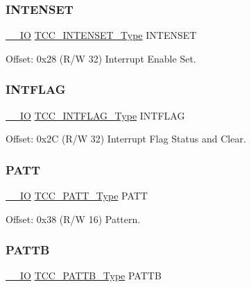 \subsubsection{\texorpdfstring{INTENSET}{INTENSET}}
{\footnotesize\ttfamily \mbox{\hyperlink{core__cm0plus_8h_aec43007d9998a0a0e01faede4133d6be}{\+\_\+\+\_\+\+IO}} \mbox{\hyperlink{union_t_c_c___i_n_t_e_n_s_e_t___type}{T\+C\+C\+\_\+\+I\+N\+T\+E\+N\+S\+E\+T\+\_\+\+Type}} I\+N\+T\+E\+N\+S\+ET}



Offset\+: 0x28 (R/W 32) Interrupt Enable Set. 

\mbox{\label{struct_tcc_ac336c2677229711cac183a8a51b2a6c9}} 
\subsubsection{\texorpdfstring{INTFLAG}{INTFLAG}}
{\footnotesize\ttfamily \mbox{\hyperlink{core__cm0plus_8h_aec43007d9998a0a0e01faede4133d6be}{\+\_\+\+\_\+\+IO}} \mbox{\hyperlink{union_t_c_c___i_n_t_f_l_a_g___type}{T\+C\+C\+\_\+\+I\+N\+T\+F\+L\+A\+G\+\_\+\+Type}} I\+N\+T\+F\+L\+AG}



Offset\+: 0x2C (R/W 32) Interrupt Flag Status and Clear. 

\mbox{\label{struct_tcc_a83f6b6d53e8159a0444875b4b8eb485d}} 
\subsubsection{\texorpdfstring{PATT}{PATT}}
{\footnotesize\ttfamily \mbox{\hyperlink{core__cm0plus_8h_aec43007d9998a0a0e01faede4133d6be}{\+\_\+\+\_\+\+IO}} \mbox{\hyperlink{union_t_c_c___p_a_t_t___type}{T\+C\+C\+\_\+\+P\+A\+T\+T\+\_\+\+Type}} P\+A\+TT}



Offset\+: 0x38 (R/W 16) Pattern. 

\mbox{\label{struct_tcc_a4df130a533cfdea3d0a85621aeebe247}} 
\subsubsection{\texorpdfstring{PATTB}{PATTB}}
{\footnotesize\ttfamily \mbox{\hyperlink{core__cm0plus_8h_aec43007d9998a0a0e01faede4133d6be}{\+\_\+\+\_\+\+IO}} \mbox{\hyperlink{union_t_c_c___p_a_t_t_b___type}{T\+C\+C\+\_\+\+P\+A\+T\+T\+B\+\_\+\+Type}} P\+A\+T\+TB}



